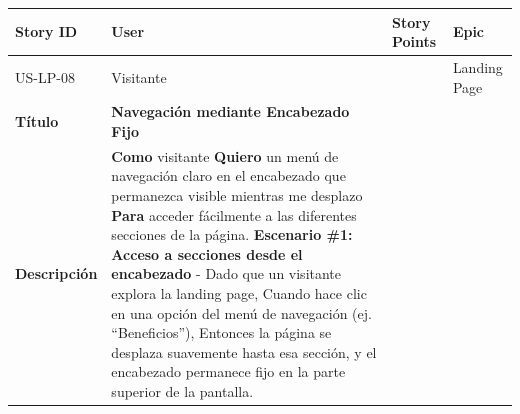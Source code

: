 {\def\LTcaptype{none} %
\begin{longtable}[]{@{}
  >{\raggedright\arraybackslash}p{}
  >{\raggedright\arraybackslash}p{}
  >{\raggedright\arraybackslash}p{}
  >{\raggedright\arraybackslash}p{}@{}}
\toprule\noalign{}
\begin{minipage}[b]{\linewidth}\raggedright
Story ID
\end{minipage} & \begin{minipage}[b]{\linewidth}\raggedright
User
\end{minipage} & \begin{minipage}[b]{\linewidth}\raggedright
Story Points
\end{minipage} & \begin{minipage}[b]{\linewidth}\raggedright
Epic
\end{minipage} \\
\midrule\noalign{}
\endhead
\bottomrule\noalign{}
\endlastfoot
US-LP-08 & Visitante & 3 & Landing Page \\
\textbf{Título} & \textbf{Navegación mediante Encabezado Fijo} & & \\
\textbf{Descripción} & \textbf{Como} visitante \textbf{Quiero} un menú
de navegación claro en el encabezado que permanezca visible mientras me
desplazo \textbf{Para} acceder fácilmente a las diferentes secciones de
la página. \textbf{Escenario \#1: Acceso a secciones desde el
encabezado} - Dado que un visitante explora la landing page, Cuando hace
clic en una opción del menú de navegación (ej. ``Beneficios''), Entonces
la página se desplaza suavemente hasta esa sección, y el encabezado
permanece fijo en la parte superior de la pantalla. & & \\
\end{longtable}
}

